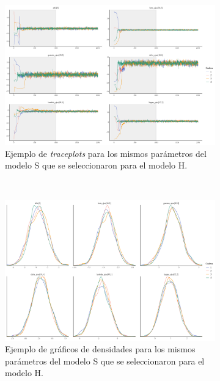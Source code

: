 \begin{figure}
	\centering
	\begin{subfigure}{0.45\textwidth}
	\includegraphics[width = \textwidth]{Figs/Convergencia/Convergencia_Traceplots_s}
	\caption{Ejemplo de \textit{traceplots} para los mismos parámetros del modelo S que se seleccionaron para el modelo H.}
	\label{fig:Traceplots_S}
	\end{subfigure}
	~
	\begin{subfigure}{0.45\textwidth}
	\includegraphics[width = \textwidth]{Figs/Convergencia/Convergencia_Densidades_S}
	\caption{Ejemplo de gráficos de densidades para los mismos parámetros del modelo S que se seleccionaron para el modelo H.}
	\label{fig:Densidades_S}
	\end{subfigure}
	~
	\begin{subfigure}{0.6\textwidth}

\end{subfigure}
\end{figure}
